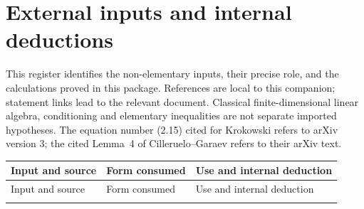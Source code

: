 \section*{External inputs and internal deductions}
This register identifies the non-elementary inputs, their precise role,
and the calculations proved in this package. References are local to this
companion; statement links lead to the relevant document. Classical
finite-dimensional linear algebra, conditioning and elementary inequalities
are not separate imported hypotheses.
The equation number (2.15) cited for Krokowski refers to arXiv version 3;
the cited Lemma~4 of Cilleruelo--Garaev refers to their arXiv text.

\begingroup
\small
\renewcommand{\arraystretch}{1.16}
\begin{longtable}{@{}L{.205\textwidth}L{.30\textwidth}L{.435\textwidth}@{}}
\toprule
Input and source & Form consumed & Use and internal deduction\\\midrule
\endfirsthead
\toprule Input and source & Form consumed & Use and internal deduction\\\midrule
\endhead
\bottomrule\endfoot


\end{longtable}
